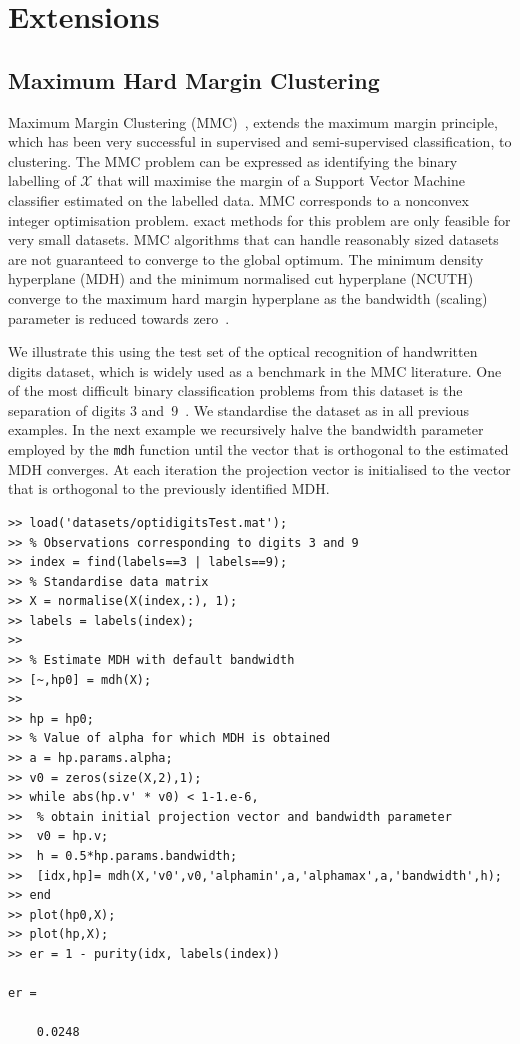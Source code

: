 \documentclass{book}
\begin{document}
\chapter{Extensions}


\section{Maximum Hard Margin Clustering}

Maximum Margin Clustering (MMC)~\cite{XuNLS2004}, extends the maximum margin
principle, which has been very successful in supervised and semi-supervised
classification, to clustering.
%
The MMC problem can be expressed as identifying the binary labelling of $\mathcal{X}$
that will maximise the margin of a Support Vector Machine classifier estimated
on the labelled data. MMC corresponds to a nonconvex integer optimisation
problem. 
%
exact methods for this problem are only feasible for very small datasets.
%
MMC algorithms that can handle reasonably sized datasets are not guaranteed
to converge to the global optimum.
%
The minimum density hyperplane (MDH) and the minimum normalised cut hyperplane
(NCUTH) converge to the maximum hard margin hyperplane as the bandwidth
(scaling) parameter is reduced towards zero~\cite{PavlidisHT2016,Hofmeyr2017}. 
%
%


We illustrate this using the test set of the optical recognition of handwritten
digits dataset, which is widely used as a benchmark in the MMC literature.
%
One of the most difficult binary classification problems from this dataset is
the separation of digits 3 and~9~\cite[Table IV]{ZhangTK2009}.
%
We standardise the dataset as in all previous examples.
%
In the next example we recursively halve the bandwidth parameter
employed by the {\tt mdh} function until the vector that is orthogonal to the
estimated MDH converges. 
%
At each iteration the projection vector is initialised to the 
vector that is orthogonal to the previously
identified MDH. 

\begin{verbatim}
>> load('datasets/optidigitsTest.mat');
>> % Observations corresponding to digits 3 and 9
>> index = find(labels==3 | labels==9);
>> % Standardise data matrix
>> X = normalise(X(index,:), 1);
>> labels = labels(index);
>> 
>> % Estimate MDH with default bandwidth
>> [~,hp0] = mdh(X);
>> 
>> hp = hp0;
>> % Value of alpha for which MDH is obtained
>> a = hp.params.alpha;
>> v0 = zeros(size(X,2),1);
>> while abs(hp.v' * v0) < 1-1.e-6,
>> 	% obtain initial projection vector and bandwidth parameter
>> 	v0 = hp.v;
>> 	h = 0.5*hp.params.bandwidth;
>> 	[idx,hp]= mdh(X,'v0',v0,'alphamin',a,'alphamax',a,'bandwidth',h);
>> end
>> plot(hp0,X);
>> plot(hp,X);
>> er = 1 - purity(idx, labels(index))

er =

    0.0248

\end{verbatim}
\end{document}
